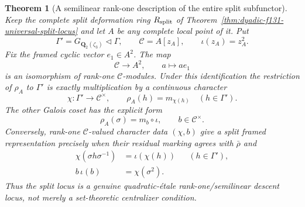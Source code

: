 \documentclass[11pt]{article}
\newtheorem{theorem}{Theorem}[section]
\theoremstyle{definition}
\begin{document}
\begin{theorem}[A semilinear rank-one description of the entire split subfunctor]
\label{thm:dyadic-f131-toric-semilinear-description}
Keep the complete split
deformation ring
$R_{\rm split}$ of
Theorem~\ref{thm:dyadic-f131-universal-split-locus}
and let $A$ be any
complete local point of it.
Put
\[
\Gamma'=
G_{\mathbf Q_2(\zeta_3)}
\triangleleft\Gamma,\qquad
\mathcal C=A[z_A],\qquad
\iota(z_A)=z_A^2.
\]
Fix the framed cyclic
vector $e_1\in A^2$.
The map
\[
\mathcal C\longrightarrow A^2,
\qquad a\longmapsto a e_1
\]
is an isomorphism
of rank-one
$\mathcal C$-modules.
Under this identification
the restriction of $\rho_A$
to $\Gamma'$ is exactly
multiplication by a
continuous character
\begin{equation}\label{eq:dyadic-f131-toric-character}
\chi:\Gamma'\longrightarrow\mathcal C^\times,
\qquad
\rho_A(h)=m_{\chi(h)}
\quad(h\in\Gamma').
\end{equation}
The other Galois coset
has the explicit form
\begin{equation}\label{eq:dyadic-f131-semilinear-sigma}
\rho_A(\sigma)=m_b\circ\iota,
\qquad b\in\mathcal C^\times.
\end{equation}
Conversely, rank-one
$\mathcal C$-valued
character data $(\chi,b)$
give a split framed
representation precisely
when their residual
marking agrees with
$\bar\rho$ and
\begin{equation}\label{eq:dyadic-f131-semilinear-character-conditions}
\boxed{
\begin{aligned}
\chi(\sigma h\sigma^{-1})
 &=\iota(\chi(h))
 &&(h\in\Gamma'),\\
b\,\iota(b)&=\chi(\sigma^2).
\end{aligned}}
\end{equation}
Thus the split locus
is a genuine
\emph{quadratic-étale
rank-one/semilinear
descent locus},
not merely a
set-theoretic
centralizer condition.


\end{theorem}
\end{document}
